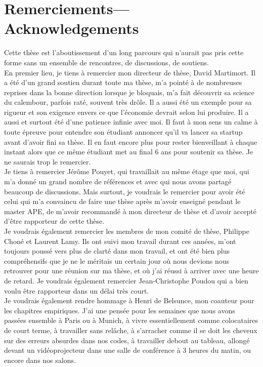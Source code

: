 
\doublespacing
\chapter*{Remerciements---Acknowledgements}
Cette thèse est l'aboutissement d'un long parcours qui n'aurait pas pris cette forme sans un ensemble de rencontres, de discussions, de soutiens.\\

En premier lieu, je tiens à remercier mon directeur de thèse, David Martimort. Il a été d'un grand soutien durant toute ma thèse, m'a pointé à de nombreuses reprises dans la bonne direction lorsque je bloquais, m'a fait découvrir sa science du calembour, parfois raté, souvent très drôle. Il a aussi été un exemple pour sa rigueur et son exigence envers ce que l'économie devrait selon lui produire. Il a aussi et surtout été d'une patience infinie avec moi. Il faut à mon sens un calme à toute épreuve pour entendre son étudiant annoncer qu'il va lancer sa startup avant d'avoir fini sa thèse. Il en faut encore plus pour rester bienveillant à chaque instant alors que ce même étudiant met au final 6 ans pour soutenir sa thèse. Je ne saurais trop le remercier. \\

Je tiens à remercier Jérôme Pouyet, qui travaillait au même étage que moi, qui m'a donné un grand nombre de références et avec qui nous avons partagé beaucoup de discussions. Mais surtout, je voudrais le remercier pour avoir été celui qui m'a convaincu de faire une thèse après m'avoir enseigné pendant le master APE, de m'avoir recommandé à mon directeur de thèse et d'avoir accepté d'être rapporteur de cette thèse.\\

Je voudrais également remercier les membres de mon comité de thèse, Philippe Choné et Laurent Lamy. Ils ont suivi mon travail durant ces années, m'ont toujours poussé vers plus de clarté dans mon travail, et ont été bien plus compréhensifs que je ne le méritais un certain jour où nous devions nous retrouver pour une réunion sur ma thèse, et où j'ai réussi à arriver avec une heure de retard. Je voudrais également remercier Jean-Christophe Poudou qui a bien voulu être rapporteur dans un délai très court.\\

Je voudrais également rendre hommage à Henri de Belsunce, mon coauteur pour les chapitres empiriques. J'ai une pensée pour les semaines que nous avons passées ensemble à Paris ou à Munich, à vivre essentiellement comme colocataires de court terme, à travailler sans relâche, à s'arracher comme il se doit les cheveux sur des erreurs absurdes dans nos codes, à travailler debout au tableau, allongé devant un vidéoprojecteur dans une salle de conférence à 3 heures du matin, ou encore dans nos salons. \\

